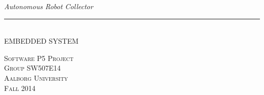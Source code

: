 \thispagestyle{empty}
\begin{flushright}
\vspace{3cm}

\phantom{hul}

\phantom{hul}

\phantom{hul}

\textsl{\Huge Autonomous Robot Collector} \\ 


\rule{14cm}{2mm} \\ 
\Huge EMBEDDED SYSTEM\\ \vspace{1.5cm}

\begin{figure}[H]
\end{figure}

\vspace{2cm} 
\textsc{\Large Software P5 Project \\
Group SW507E14 \\
Aalborg University\\
Fall 2014\\}
\end{flushright}